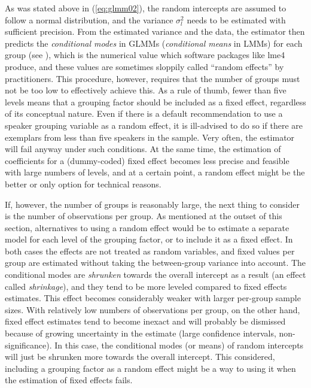 \documentclass[a4paper,12pt]{article}
\begin{document}
As was stated above in (\ref{eq:glmm02}), the random intercepts are assumed to follow a normal distribution, and the variance $\sigma_l^2$ needs to be estimated with sufficient precision.
From the estimated variance and the data, the estimator then predicts the \textit{conditional modes} in GLMMs (\textit{conditional means} in LMMs) for each group (see \citealt{Bates2010}), which is the numerical value which software packages like lme4 produce, and these values are sometimes sloppily called ``random effects'' by practitioners.
This procedure, however, requires that the number of groups must not be too low to effectively achieve this.
As a rule of thumb, fewer than five levels means that a grouping factor should be included as a fixed effect, regardless of its conceptual nature.
Even if there is a default recommendation to use a speaker grouping variable as a random effect, it is ill-advised to do so if there are exemplars from less than five speakers in the sample.
Very often, the estimator will fail anyway under such conditions.
At the same time, the estimation of coefficients for a (dummy-coded) fixed effect becomes less precise and feasible with large numbers of levels, and at a certain point, a random effect might be the better or only option for technical reasons.

If, however, the number of groups is reasonably large, the next thing to consider is the number of observations per group.
As mentioned at the outset of this section, alternatives to using a random effect would be to estimate a separate model for each level of the grouping factor, or to include it as a fixed effect.
In both cases the effects are not treated as random variables, and fixed values per group are estimated without taking the between-group variance into account.
The conditional modes are \textit{shrunken} towards the overall intercept as a result (an effect called \textit{shrinkage}), and they tend to be more leveled compared to fixed effects estimates.
This effect becomes considerably weaker with larger per-group sample sizes.
With relatively low numbers of observations per group, on the other hand, fixed effect estimates tend to become inexact and will probably be dismissed because of growing uncertainty in the estimate (large confidence intervals, non-significance).
In this case, the conditional modes (or means) of random intercepts will just be shrunken more towards the overall intercept.
This considered, including a grouping factor as a random effect might be a way to using it when the estimation of fixed effects fails.
\end{document}
